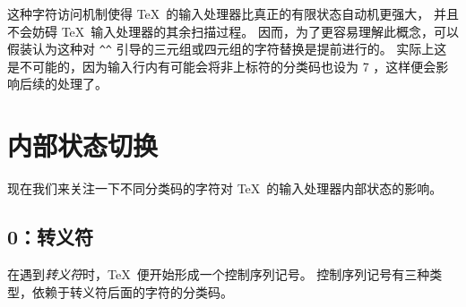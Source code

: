 \documentclass{book}
\begin{document}
这种字符访问机制使得 \TeX\ 的输入处理器比真正的有限状态自动机更强大，
并且不会妨碍 \TeX\ 输入处理器的其余扫描过程。
因而，为了更容易理解此概念，可以假装认为这种对 \verb>^^>
引导的三元组或四元组的字符替换是提前进行的。
实际上这是不可能的，因为输入行内有可能会将非上标符的分类码也设为 7
，这样便会影响后续的处理了。

\section{内部状态切换}

现在我们来关注一下不同分类码的字符对 \TeX\ 的输入处理器内部状态的影响。

\subsection{0：转义符}

在遇到{\em 转义符}时，\TeX\ 便开始形成一个控制序列记号。
控制序列记号有三种类型，依赖于转义符后面的字符的分类码。
\end{document}
